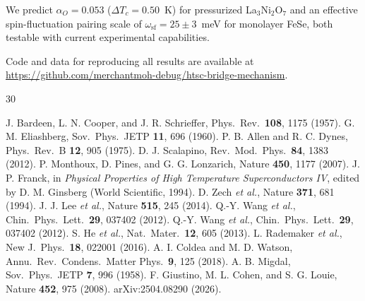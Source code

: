 \documentclass[twocolumn,showpacs,preprintnumbers,amsmath,amssymb,prb]{revtex4-2}
\begin{document}
We predict $\alpha_O = 0.053$ ($\Delta T_c = 0.50$~K) for pressurized La$_3$Ni$_2$O$_7$ and an effective spin-fluctuation pairing scale of $\omega_{\mathrm{sf}} = 25 \pm 3$~meV for monolayer FeSe, both testable with current experimental capabilities.

Code and data for reproducing all results are available at \url{https://github.com/merchantmoh-debug/htsc-bridge-mechanism}.


\begin{thebibliography}{30}

 J. Bardeen, L. N. Cooper, and J. R. Schrieffer, Phys.\ Rev.\ \textbf{108}, 1175 (1957).
 G. M. Eliashberg, Sov.\ Phys.\ JETP \textbf{11}, 696 (1960).
 P. B. Allen and R. C. Dynes, Phys.\ Rev.\ B \textbf{12}, 905 (1975).
 D. J. Scalapino, Rev.\ Mod.\ Phys.\ \textbf{84}, 1383 (2012).
 P. Monthoux, D. Pines, and G. G. Lonzarich, Nature \textbf{450}, 1177 (2007).
 J. P. Franck, in \textit{Physical Properties of High Temperature Superconductors IV}, edited by D. M. Ginsberg (World Scientific, 1994).
 D. Zech \textit{et al.}, Nature \textbf{371}, 681 (1994).
 J. J. Lee \textit{et al.}, Nature \textbf{515}, 245 (2014).
 Q.-Y. Wang \textit{et al.}, Chin.\ Phys.\ Lett.\ \textbf{29}, 037402 (2012).
 Q.-Y. Wang \textit{et al.}, Chin.\ Phys.\ Lett.\ \textbf{29}, 037402 (2012).
 S. He \textit{et al.}, Nat.\ Mater.\ \textbf{12}, 605 (2013).
 L. Rademaker \textit{et al.}, New J.\ Phys.\ \textbf{18}, 022001 (2016).
 A. I. Coldea and M. D. Watson, Annu.\ Rev.\ Condens.\ Matter Phys.\ \textbf{9}, 125 (2018).
 A. B. Migdal, Sov.\ Phys.\ JETP \textbf{7}, 996 (1958).
 F. Giustino, M. L. Cohen, and S. G. Louie, Nature \textbf{452}, 975 (2008).
 arXiv:2504.08290 (2026).

\end{thebibliography}
\end{document}
